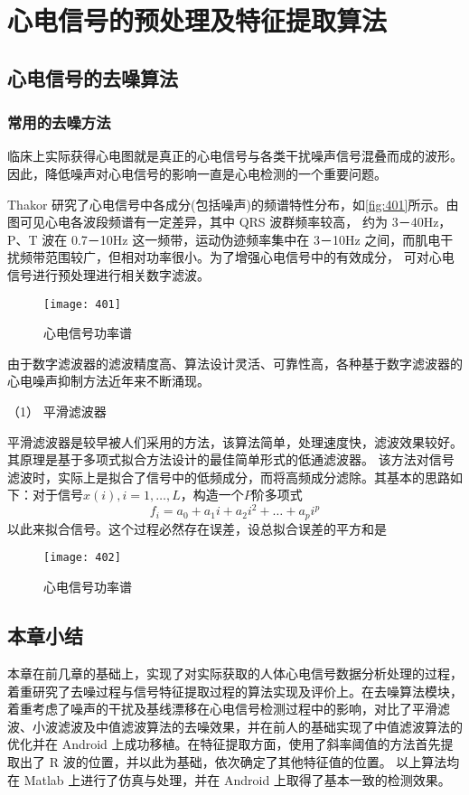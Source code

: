 \chapter{心电信号的预处理及特征提取算法}
\section{心电信号的去噪算法}
\subsection{常用的去噪方法}
临床上实际获得心电图就是真正的心电信号与各类干扰噪声信号混叠而成的波形。因此，降低噪声对心电信号的影响一直是心电检测的一个重要问题\cite{11}。 

Thakor 研究了心电信号中各成分(包括噪声)的频谱特性分布\cite{12}，如\autoref{fig:401}所示。由图可见心电各波段频谱有一定差异，其中 QRS 波群频率较高，
约为 3－40Hz，P、T 波在 0.7－10Hz 这一频带，运动伪迹频率集中在 3－10Hz 之间，而肌电干扰频带范围较广，但相对功率很小。为了增强心电信号中的有效成分，
可对心电信号进行预处理进行相关数字滤波\cite{13}。  
\begin{figure}[htbp]
    \centering
    \texttt{[image: 401]}
    \caption{\label{fig:401}心电信号功率谱}
\end{figure}

由于数字滤波器的滤波精度高、算法设计灵活、可靠性高，各种基于数字滤波器的心电噪声抑制方法近年来不断涌现。 

（1） 平滑滤波器 

平滑滤波器是较早被人们采用的方法，该算法简单，处理速度快，滤波效果较好\cite{14}。其原理是基于多项式拟合方法设计的最佳简单形式的低通滤波器\cite{15}。
该方法对信号滤波时，实际上是拟合了信号中的低频成分，而将高频成分滤除。其基本的思路如下：对于信号$x(i),i=1,\dots,L$，构造一个$P$阶多项式
\begin{equation}
    \label{equ:401}
    f_i=a_0+a_1i+a_2i^{2}+\dots+a_pi^{p}
\end{equation}
以此来拟合信号。这个过程必然存在误差，设总拟合误差的平方和是 

\begin{figure}[htbp]
    \centering
    \texttt{[image: 402]}
    \caption{\label{fig:402}心电信号功率谱}
\end{figure}



\section{本章小结}
本章在前几章的基础上，实现了对实际获取的人体心电信号数据分析处理的过程，着重研究了去噪过程与信号特征提取过程的算法实现及评价上。在去噪算法模块，
着重考虑了噪声的干扰及基线漂移在心电信号检测过程中的影响，对比了平滑滤波、小波滤波及中值滤波算法的去噪效果，并在前人的基础实现了中值滤波算法的优化并在
Android 上成功移植。在特征提取方面，使用了斜率阈值的方法首先提取出了 R 波的位置，并以此为基础，依次确定了其他特征值的位置。
以上算法均在 Matlab 上进行了仿真与处理，并在 Android 上取得了基本一致的检测效果。

